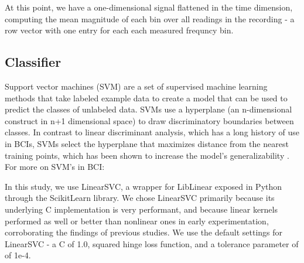 



At this point, we have a one-dimensional signal flattened in the time dimension, computing the mean magnitude of each bin over all readings in the recording - a row vector with one entry for each each measured frequncy bin. 

\subsection{Classifier}

Support vector machines (SVM) are a set of supervised machine learning methods that take labeled example data to create a model that can be used to predict the classes of unlabeled data. SVMs use a hyperplane (an n-dimensional construct in n+1 dimensional space) to draw discriminatory boundaries between classes. In contrast to linear discriminant analysis, which has a long history of use in BCIs, SVMs select the hyperplane that maximizes distance from the nearest training points, which has been shown to increase the model's generalizability \cite{burges_tutorial_1998}.  For more on SVM's in BCI: \cite{garrett_comparison_2003,grierson_better_2011} 

In this study, we use LinearSVC, \cite{fan_liblinear:_2008} a wrapper for LibLinear exposed in Python through the ScikitLearn library. \cite{pedregosa_scikit-learn:_2011} We chose LinearSVC primarily because its underlying C implementation is very performant, and because linear kernels performed as well or better than nonlinear ones in early experimentation, corroborating the findings of previous studies. \cite{garrett_comparison_2003,lotte_review_2007}  We use the default settings for LinearSVC - a C of 1.0, squared hinge loss function, and a tolerance parameter of of 1e-4. 

